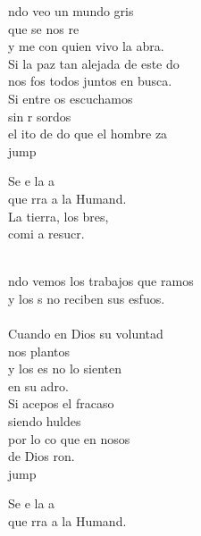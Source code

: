 \begin{cancion}%
	ndo veo un mundo gris \\
	que se nos re\\
	y me  con quien vivo la abra.\\
	Si la paz tan alejada de este do\\
	nos fos todos juntos en busca.\\
	Si entre os escuchamos \\
	sin r sordos\\
	el ito de do que el hombre za\\jump\\
	\begin{chorus}%
	Se e la a\\
	que rra a la Humand.\\
	La tierra, los bres,\\
	comi a resucr.\\
	\end{chorus}%
	\jump\\
	ndo vemos los trabajos que ramos\\
	y los s no reciben sus esfuos.\\
	\jump\\
Cuando en Dios su voluntad \\
	nos plantos\\
	y los es no lo sienten \\
	en su adro.\\
	Si acepos el fracaso \\
	siendo huldes\\
	por lo co que en nosos \\
	de Dios ron.\\jump\\
	\begin{chorus}%
	Se e la a\\
	que rra a la Humand.\\

\end{chorus}
\end{cancion}
